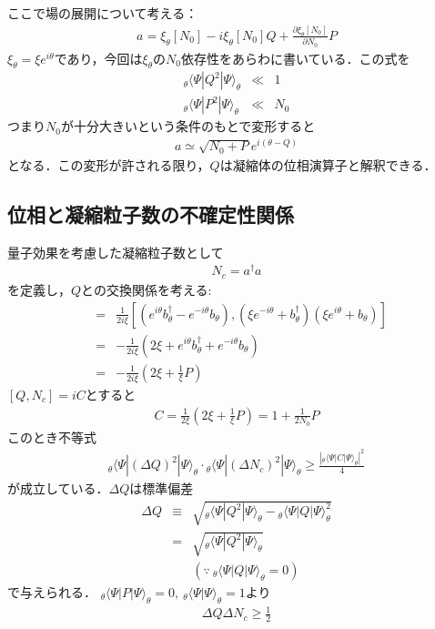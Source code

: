 \documentclass[10.5pt,a4paper]{jreport}
\begin{document}
ここで場の展開について考える：
\begin{eqnarray}
  a =\xi_\theta[N_0] -i\xi_\theta[N_0]Q + \frac{\partial \xi_\theta[N_0]}{\partial N_0}P
\end{eqnarray}
$\xi_\theta = \xi e^{i\theta}$であり，今回は$\xi_\theta$の$N_0$依存性をあらわに書いている．この式を
\begin{eqnarray}
  _\theta\langle\Psi|Q^2|\Psi\rangle_\theta &\ll&1\label{Q_approximation}\\
  _\theta\langle\Psi|P^2|\Psi\rangle_\theta &\ll&N_0
\end{eqnarray}
つまり$N_0$が十分大きいという条件のもとで変形すると
\begin{eqnarray}
  a \simeq \sqrt{N_0+P}e^{i(\theta-Q)}
\end{eqnarray}
となる．この変形が許される限り，$Q$は凝縮体の位相演算子と解釈できる．
\subsection{位相と凝縮粒子数の不確定性関係}
量子効果を考慮した凝縮粒子数として
\begin{eqnarray}
  N_c = a^\dagger a
\end{eqnarray}
を定義し，$Q$との交換関係を考える:
\begin{eqnarray}
  [Q,N_c]&=&\frac{1}{2i\xi}\left[(e^{i\theta}b_\theta^\dagger-e^{-i\theta}b_\theta),(\xi e^{-i\theta}+b_\theta^\dagger)(\xi e^{i\theta}+b_\theta)\right]\\
  &=&-\frac{1}{2i\xi}\left(2\xi+e^{i\theta}b^\dagger_\theta+e^{-i\theta}b_\theta\right)\\
  &=&-\frac{1}{2i\xi}\left(2\xi+\frac{1}{\xi}P\right)
\end{eqnarray}
$[Q,N_c]=iC$とすると
\begin{eqnarray}
  C=\frac{1}{2\xi}\left(2\xi+\frac{1}{\xi}P\right)=1+\frac{1}{2N_0}P
\end{eqnarray}
このとき不等式
\begin{eqnarray}
  _\theta\langle\Psi|(\Delta Q)^2|\Psi\rangle_\theta\!\cdot  \!_\theta\langle\Psi|(\Delta N_c)^2|\Psi\rangle_\theta \geq \frac{\left| _\theta\langle\Psi|C|\Psi\rangle_\theta\right|^2}{4}
\end{eqnarray}
が成立している．$\Delta Q$は標準偏差
\begin{eqnarray}
  \Delta Q &\equiv& \sqrt{_\theta\langle\Psi|Q^2|\Psi\rangle_\theta-\!_\theta\langle\Psi|Q|\Psi\rangle_\theta^2}\\
  &=&\sqrt{_\theta\langle\Psi|Q^2|\Psi\rangle_\theta}\label{standard_deviation}\\
  &&(\because\ _\theta\langle\Psi|Q|\Psi\rangle_\theta=0)
\end{eqnarray}
で与えられる．
$_\theta\langle\Psi|P|\Psi\rangle_\theta=0,\ _\theta\langle\Psi|\Psi\rangle_\theta=1$より
\begin{eqnarray}
  \Delta Q\Delta N_c\geq \frac{1}{2}
\end{eqnarray}
\end{document}
